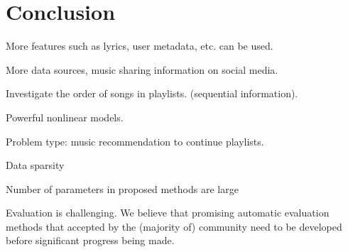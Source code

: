\section{Conclusion}

More features such as lyrics, user metadata, etc. can be used.

More data sources, music sharing information on social media.

Investigate the order of songs in playlists. (sequential information).

Powerful nonlinear models.

Problem type: music recommendation to continue playlists.

Data sparsity

Number of parameters in proposed methods are large

Evaluation is challenging.
We believe that promising automatic evaluation methods that accepted by the (majority of) community need to be 
developed before significant progress being made.

